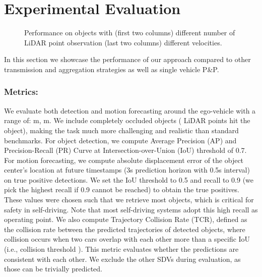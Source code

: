 \documentclass[runningheads]{llncs}
\begin{document}
\section{Experimental Evaluation}

\begin{figure*}[t]
  \centering
\caption{Performance on objects with (first two columns) different number of LiDAR point observation (last two columns) different velocities.}
  \label{fig:diff_performance}
\end{figure*}

In this section we showcase the performance of our approach compared to other transmission and aggregation strategies as well as single vehicle P\&P.

\subsubsection{Metrics:}

We evaluate both detection and motion forecasting around the ego-vehicle with a range of: m, m. We include completely occluded objects ( LiDAR points hit the object), making the task much more challenging and realistic than 
standard benchmarks.
For object detection, we compute Average Precision (AP) and Precision-Recall (PR) Curve at Intersection-over-Union (IoU) threshold of 0.7.
For motion forecasting, we compute absolute  displacement error of the object center's location at future timestamps (3s prediction horizon with 0.5s interval) on true positive detections. We set the IoU threshold to 0.5 and recall to 0.9 (we pick the highest recall if 0.9 cannot be reached) to obtain the true positives. 
These values were chosen such that  we retrieve most objects, which is critical for safety in self-driving.
Note that most self-driving systems adopt this high recall as operating point.
We also compute Trajectory Collision Rate (TCR),  defined as the collision rate between the predicted trajectories of detected objects, where collision occurs when two cars overlap with each other more than a specific IoU (i.e., collision threshold ). This metric evaluates whether the predictions  are consistent with each other.
We exclude the other SDVs 
during evaluation, as those can be trivially predicted.
\end{document}
